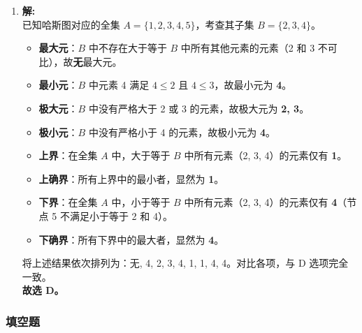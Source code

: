 \begin{enumerate}
	\item \textbf{解:}\\
	已知哈斯图对应的全集 $A = \{1, 2, 3, 4, 5\}$，考查其子集 $B = \{2, 3, 4\}$。
	\begin{itemize}
		\item \textbf{最大元}：$B$ 中不存在大于等于 $B$ 中所有其他元素的元素（2 和 3 不可比），故\textbf{无}最大元。
		\item \textbf{最小元}：$B$ 中元素 4 满足 $4 \le 2$ 且 $4 \le 3$，故最小元为 \textbf{4}。
		\item \textbf{极大元}：$B$ 中没有严格大于 2 或 3 的元素，故极大元为 \textbf{2, 3}。
		\item \textbf{极小元}：$B$ 中没有严格小于 4 的元素，故极小元为 \textbf{4}。
		\item \textbf{上界}：在全集 $A$ 中，大于等于 $B$ 中所有元素（2, 3, 4）的元素仅有 \textbf{1}。
		\item \textbf{上确界}：所有上界中的最小者，显然为 \textbf{1}。
		\item \textbf{下界}：在全集 $A$ 中，小于等于 $B$ 中所有元素（2, 3, 4）的元素仅有 \textbf{4}（节点 5 不满足小于等于 2 和 4）。
		\item \textbf{下确界}：所有下界中的最大者，显然为 \textbf{4}。
	\end{itemize}
	将上述结果依次排列为：无, 4, 2, 3, 4, 1, 1, 4, 4。对比各项，与 D 选项完全一致。\\
	\textbf{故选 D。}
	
\end{enumerate}

\subsubsection{填空题}

